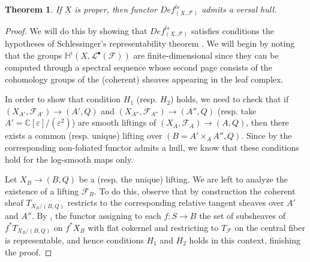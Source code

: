 \documentclass[reqno]{amsart}
\newcommand\C{\mathbb{C}}
\renewcommand\H{\mathbb{H}}
\newcommand{\F}{\mathscr{F}}
\renewcommand{\H}{\mathbb{H}}
\newcounter{Theorem}
\newtheorem{theorem}{Theorem}[section]
\theoremstyle{definition}
\theoremstyle{named}
\begin{document}
\begin{theorem}
    If $\underline{X}$ is proper, then functor  $Def^{ls}_{(X,\F)}$ admits a versal hull.
\end{theorem}
\begin{proof}
    We will do this by showing that $Def^{ls}_{(X,\F)}$ satisfies conditions the hypotheses of Schlessinger's representability theorem \cite[Theorem 2.11]{schlessinger1968functors}. We will begin by noting that the groups $\H^i(X,\mathcal L^\bullet(\F))$ are finite-dimensional since they can be computed through a spectral sequence whose second page consists of the cohomology groups of the (coherent) sheaves appearing in the leaf complex.

In order to show that condition $H_1$ (resp. $H_2$) holds, we need to check that if $(X_{A'},\F_{A'})\to (A',Q)$ and $(X_{A''},\F_{A''})\to (A'',Q)$ (resp. take $A'=\C[\varepsilon]/(\varepsilon^2)$)
are smooth liftings of $(X_{A},\F_A)\to (A,Q)$, then there exists a common (resp. unique) lifting over $(B=A'\times_A A'',Q)$. Since by \cite[Theorem 8.7]{kato1996dlog_def} the corresponding non-foliated functor admits a hull, we know that these conditions hold for the log-smooth maps only.

Let $X_B\to (B,Q)$ be a (resp. the unique) lifting. We are left to analyze the existence of a lifting $\F_B$. To do this, observe that by construction the coherent sheaf $T_{X_B/(B,Q)}$ restricts to the corresponding relative tangent sheaves over $A'$ and $A''$. By \cite[Theor\'eme 1]{pourcin1969theoreme}, the functor assigning to each $f:S\to B$ the set of subsheaves of $f^*T_{X_B/(B,Q)}$ on $f^*X_B$ with flat cokernel and restricting to $T_\F$ on the central fiber is representable, and hence conditions $H_1$ and $H_2$ holds in this context, finishing the proof.
\end{proof}
\end{document}
